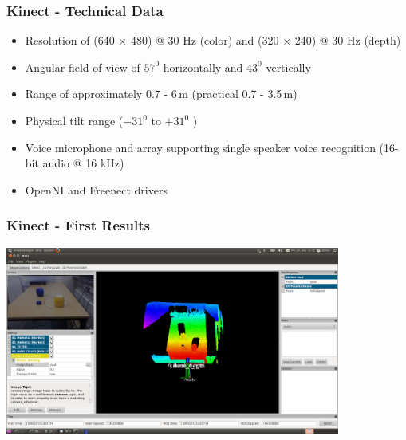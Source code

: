 \begin{frame}
 \frametitle{Kinect - Technical Data}
\begin{itemize}
  \item Resolution of (640 $\times$ 480) @ 30 Hz (color) and (320 $\times$ 240) @ 30 Hz (depth)
  \item Angular field of view of $57^0$ horizontally and $43^0$ vertically
  \item Range of approximately 0.7 - 6\,m (practical 0.7 - 3.5\,m)
  \item Physical tilt range ($-31^0$  to $+31^0$ )
  \item Voice microphone and array supporting single speaker voice recognition (16-bit audio @ 16 kHz)
  \item OpenNI and Freenect drivers
\end{itemize}

\end{frame}


\begin{frame} 
 \frametitle{Kinect - First Results}
\includegraphics[width=11cm]{images/ros_rviz.png}
\end{frame}


